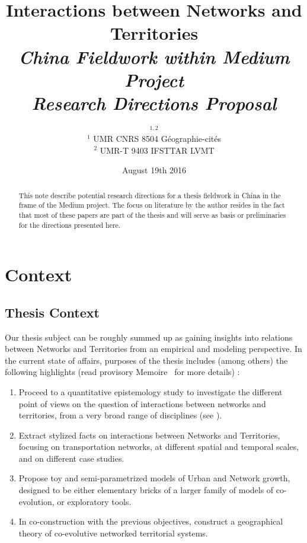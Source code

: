 


\title{Interactions between Networks and Territories\\\medskip
\textit{China Fieldwork within Medium Project}\\
\textit{Research Directions Proposal}
}
\author{$^{1,2}$\\
$^1$ UMR CNRS 8504 G{\'e}ographie-cit{\'e}s\\
$^2$ UMR-T 9403 IFSTTAR LVMT
}
\date{August 19th 2016}


\maketitle

\justify




\begin{abstract}
This note describe potential research directions for a thesis fieldwork in China in the frame of the Medium project. The focus on literature by the author resides in the fact that most of these papers are part of the thesis and will serve as basis or preliminaries for the directions presented here.
\end{abstract}



\section{Context}

\subsection{Thesis Context}

Our thesis subject can be roughly summed up as gaining insights into relations between Networks and Territories from an empirical and modeling perspective. In the current state of affairs, purposes of the thesis includes (among others) the following highlights (read provisory Memoire~\cite{raimbault2016memoire} for more details) :

\begin{enumerate}
\item Proceed to a quantitative epistemology study to investigate the different point of views on the question of interactions between networks and territories, from a very broad range of disciplines (see \cite{raimbault2015models}).
\item Extract stylized facts on interactions between Networks and Territories, focusing on transportation networks, at different spatial and temporal scales, and on different case studies.
\item Propose toy and semi-parametrized models of Urban and Network growth, designed to be either elementary bricks of a larger family of models of co-evolution, or exploratory tools.
\item In co-construction with the previous objectives, construct a geographical theory of co-evolutive networked territorial systems.
\end{enumerate}




